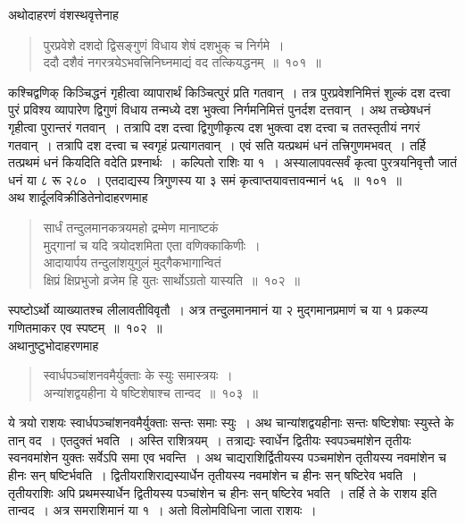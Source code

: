 \documentclass[11pt, openany]{book}
\begin{document}
\vspace{-2mm}
अथोदाहरणं वंशस्थवृत्तेनाह\textendash
\begin{quote}
    \eg 
    पुरप्रवेशे दशदो द्विसङ्गुणं विधाय शेषं दशभुक् च निर्गमे~। \\
 ददौ दशैवं नगरत्रयेऽभवत्त्रिनिघ्नमाद्यं वद तत्कियद्धनम्~॥~१०१~॥~
\end{quote}
 
 कश्चिद्वणिक् किञ्चिद्धनं गृहीत्वा व्यापारार्थं किञ्चित्पुरं प्रति गतवान्~। तत्र 
पुरप्रवेशनिमित्तं शुल्कं दश दत्त्वा पुरं प्रविश्य व्यापारेण द्विगुणं
विधाय तन्मध्ये 
दश भुक्त्वा निर्गमनिमित्तं पुनर्दश दत्तवान्~। अथ तच्छेषधनं गृहीत्वा
पुरान्तरं 
गतवान्~। तत्रापि दश दत्त्वा द्विगुणीकृत्य दश भुक्त्वा दश दत्त्वा च
ततस्तृतीयं 
नगरं गतवान्~। तत्रापि दश दत्त्वा च स्वगृहं प्रत्यागतवान्~। एवं सति 
यत्प्रथमं धनं तत्त्रिगुणमभवत्~। तर्हि तत्प्रथमं धनं कियदिति वदेति
प्रश्नार्थः~। कल्पितो 
राशिः या १~। अस्यालापवत्सर्वं कृत्वा पुरत्रयनिवृत्तौ जातं धनं या ८ रू २८०~। एतदाद्यस्य त्रिगुणस्य या ३ समं कृत्वाप्तयावत्तावन्मानं 
५६~॥~१०१~॥~\\

\vspace{-2mm}
 अथ शार्दूलविक्रीडितेनोदाहरणमाह\textendash
\newpage%
\begin{quote}
    \eg 
    सार्धं तन्दुलमानकत्रयमहो द्रम्मेण मानाष्टकं \\
मुद्गानां च यदि त्रयोदशमिता एता वणिक्काकिणीः~। \\
आदायार्पय तन्दुलांशयुगुलं मुद्गैकभागान्वितं \\
क्षिप्रं क्षिप्रभुजो व्रजेम हि युतः सार्थोऽग्रतो यास्यति~॥~१०२~॥~
\end{quote}

 स्पष्टोऽर्थो व्याख्यातश्च लीलावतीविवृतौ~। अत्र तन्दुलमानमानं या २
मुद्गमानप्रमाणं च या १ प्रकल्प्य गणितमाकर एव स्पष्टम्~॥~१०२~॥\\

\vspace{-2mm}
 अथानुष्टुभोदाहरणमाह\textendash 
\begin{quote}
    \eg 
    स्वार्धपञ्चांशनवमैर्युक्ताः के स्युः समास्त्रयः~। \\
अन्यांशद्वयहीना ये षष्टिशेषाश्च तान्वद~॥~१०३~॥~
\end{quote}

 ये त्रयो राशयः स्वार्धपञ्चांशनवमैर्युक्ताः सन्तः समाः स्युः~। अथ
चान्यांशद्वयहीनाः सन्तः षष्टिशेषाः स्युस्ते के तान् वद~। एतदुक्तं भवति~। अस्ति
राशित्रयम्~। 
तत्राद्यः स्वार्धेन द्वितीयः स्वपञ्चमांशेन तृतीयः स्वनवमांशेन युक्तः
सर्वेऽपि समा 
एव भवन्ति~। अथ चाद्यराशिर्द्वितीयस्य पञ्चमांशेन तृतीयस्य नवमांशेन च
हीनः 
सन् षष्टिर्भवति~। द्वितीयराशिराद्यस्यार्धेन तृतीयस्य नवमांशेन च हीनः
सन् षष्टिरेव 
भवति~। तृतीयराशिः अपि प्रथमस्यार्धेन द्वितीयस्य पञ्चांशेन च हीनः सन्
षष्टिरेव 
भवति~। तर्हि ते के राशय इति तान्वद~। अत्र समराशिमानं या १~। अतो 
विलोमविधिना जाता राशयः~। \\
\end{document}
